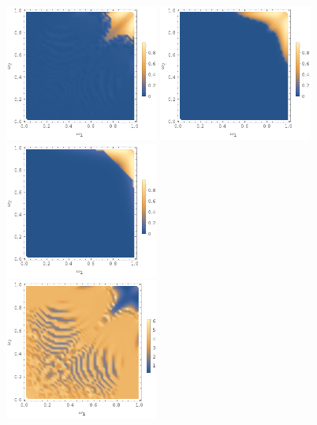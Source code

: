 \documentclass{report}
\begin{document}
\begin{figure}[p]
  \begin{adjustwidth}{-1in}{-1in}
    \centering
    \includegraphics[width=0.45\textwidth]{plot/energy-ratio-phi6-1d.png}
    \includegraphics[width=0.45\textwidth]{plot/energy-ratio-phi6-2d.png}
    \includegraphics[width=0.45\textwidth]{plot/energy-ratio-phi6-3d.png} \\
    \includegraphics[width=0.45\textwidth]{plot/r_max-phi6-1d.png}

\end{adjustwidth}
\end{figure}
\end{document}
